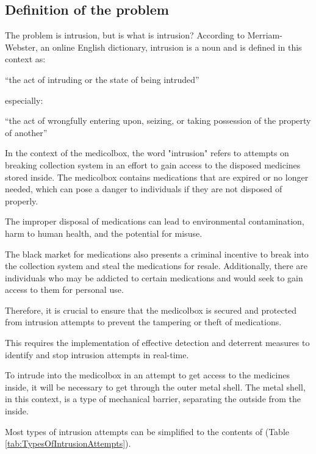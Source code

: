 \documentclass[../main.tex]{subfiles}
\begin{document}
\subsection{Definition of the problem}
The problem is \gls{intrusion}, but is what is \gls{intrusion}?
According to Merriam-Webster,
an online English dictionary,
\gls{intrusion} is a noun and is defined in this context as:

\enquote{the act of intruding or the state of being intruded}\cite{definition-intrusion}

especially:

\enquote{the act of wrongfully entering upon, seizing,
or taking possession of the property of another}\cite{definition-intrusion}

In the context of the \gls{medicolbox}, the word
"\gls{intrusion}" refers to attempts on breaking collection system
in an effort to gain access to the disposed medicines stored inside.
The \gls{medicolbox} contains medications that are
expired or no longer needed, which can pose a danger to
individuals if they are not disposed of properly\cite{peds}. 

The improper disposal of medications can lead to
environmental contamination, harm to human health,
and the potential for misuse.

The black market for medications also presents a criminal incentive
to break into the collection system and steal the medications for resale.
Additionally, there are individuals who may be addicted to certain
medications and would seek to gain access to them for personal use.

Therefore, it is crucial to ensure that the \gls{medicolbox} is secured
and protected from \gls{intrusion} attempts to prevent the
tampering or theft of medications.

This requires the implementation of effective detection
and deterrent measures to identify and stop
\gls{intrusion} attempts in real-time.

To intrude into the \gls{medicolbox} in an attempt to get access to
the medicines inside, it will be necessary to get through
the outer metal shell. The metal shell, in this context,
is a type of mechanical barrier,
separating the outside from the inside.

Most types of \gls{intrusion} attempts can be simplified to the contents of
(Table \ref{tab:TypesOfIntrusionAttempts}).
\end{document}
